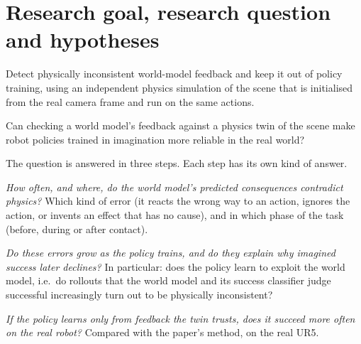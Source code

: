 \documentclass[11pt,a4paper]{article}
\theoremstyle{plain}
\theoremstyle{definition}
\theoremstyle{remark}
\begin{document}
\section{Research goal, research question and hypotheses}\label{sec:rq}

\begin{rqbox}[title={Research goal}]
Detect physically inconsistent world-model feedback and keep it out of policy training, using an independent physics simulation of the scene that is initialised from the real camera frame and run on the same actions.
\end{rqbox}

\begin{rqbox}[title={Research question}]
Can checking a world model's feedback against a physics twin of the scene make robot policies trained in imagination more reliable in the real world?
\end{rqbox}

The question is answered in three steps. Each step has its own kind of answer.

\begin{description}[leftmargin=0pt,itemsep=3pt]
\item[RQ1 · Detect.] \emph{How often, and where, do the world model's predicted consequences contradict physics?} Which kind of error (it reacts the wrong way to an action, ignores the action, or invents an effect that has no cause), and in which phase of the task (before, during or after contact).
\item[RQ2 · Explain.] \emph{Do these errors grow as the policy trains, and do they explain why imagined success later declines?} In particular: does the policy learn to exploit the world model, i.e.\ do rollouts that the world model and its success classifier judge successful increasingly turn out to be physically inconsistent?
\item[RQ3 · Improve.] \emph{If the policy learns only from feedback the twin trusts, does it succeed more often on the real robot?} Compared with the paper's method, on the real UR5.
\end{description}
\end{document}
